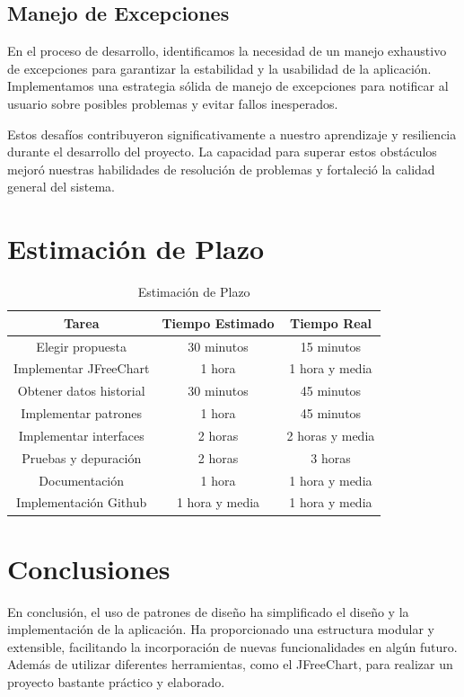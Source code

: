 \documentclass{article}
\begin{document}
\subsection{Manejo de Excepciones}
En el proceso de desarrollo, identificamos la necesidad de un manejo exhaustivo de excepciones para garantizar la estabilidad y la usabilidad de la aplicación. Implementamos una estrategia sólida de manejo de excepciones para notificar al usuario sobre posibles problemas y evitar fallos inesperados.

Estos desafíos contribuyeron significativamente a nuestro aprendizaje y resiliencia durante el desarrollo del proyecto. La capacidad para superar estos obstáculos mejoró nuestras habilidades de resolución de problemas y fortaleció la calidad general del sistema.

\section{Estimación de Plazo}
\begin{table}[H]
  \centering
  \caption{Estimación de Plazo}
  \begin{tabular}{|c|c|c|}
    \hline
    \textbf{Tarea} & \textbf{Tiempo Estimado} & \textbf{Tiempo Real} \\
    \hline
    Elegir propuesta & 30 minutos & 15 minutos \\
    Implementar JFreeChart & 1 hora & 1 hora y media \\
    Obtener datos historial & 30 minutos & 45 minutos \\
    Implementar patrones & 1 hora & 45 minutos \\
    Implementar interfaces & 2 horas & 2 horas y media \\
    Pruebas y depuración & 2 horas & 3 horas \\
    Documentación & 1 hora & 1 hora y media \\
    Implementación Github & 1 hora y media & 1 hora y media \\
    \hline
  \end{tabular}
  \label{Estimación de Plazo}
\end{table}

\section{Conclusiones}
En conclusión, el uso de patrones de diseño ha simplificado el diseño y la implementación de la aplicación. Ha proporcionado una estructura modular y extensible, facilitando la incorporación de nuevas funcionalidades en algún futuro. Además de utilizar diferentes herramientas, como el JFreeChart, para realizar un proyecto bastante práctico y elaborado.
\end{document}
